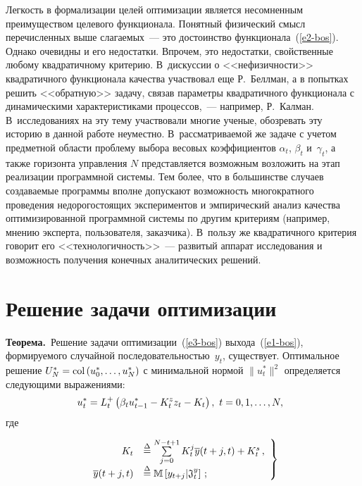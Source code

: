 \begin{multicols}{2}
 Легкость в формализации целей оптимизации является несомненным
преимуществом целевого функционала. Понятный физический смысл
перечисленных выше слагаемых~--- это достоинство
 функционала~(\ref{e2-bos}). Однако очевидны и его недостатки.
Впрочем, это недостатки, свойственные любому квадратичному критерию.
В~дискуссии о <<нефизичности>> квадратичного функционала качества
участвовал еще Р.~Беллман, а в попытках решить <<обратную>> задачу, связав
параметры квад\-ра\-тич\-но\-го функционала с динамическими характеристиками
процессов,~--- например, Р.~Калман. В~исследованиях на эту тему участвовали
многие ученые, обозревать эту историю в данной работе неуместно.
В~рассматриваемой же задаче с учетом предметной области проблему выбора
весовых коэффициентов $\alpha_t$, $\beta_t$ и~$\gamma_t$, а также горизонта
управ\-ле\-ния $N$ представляется возможным возложить на этап реализации
программной системы. Тем более, что в большинстве случаев создаваемые
программы вполне допускают возможность многократного проведения
недорогостоящих экспериментов и эмпирический анализ качества
оптимизированной программной системы по другим критериям (например,
мнению эксперта, пользователя, заказчика). В~пользу же квадратичного
критерия говорит его <<технологичность>>~--- развитый аппарат исследования
и возможность получения конечных аналитических решений.

\section{Решение задачи оптимизации}

 \noindent
 \textbf{Теорема.}\ Решение задачи оптимизации~(\ref{e3-bos})
 выхода~(\ref{e1-bos}), формируемого случайной
последова\-тель\-ностью~$y_t$, существует. Оптимальное решение
$U_N^*\hm= \mathrm{col} \left( u_0^*, \ldots , u_N^*\right)$ с минимальной нормой
$\| u_t^*\|^2$ определяется следующими выражениями:
 \begin{equation}
\hspace*{-3mm}u_t^*=L_t^+ \left( \beta_t u^*_{t-1} -K_t^z z_t -K_t\right),\ t=0,1,\ldots , N,\!\!
 \label{e4-bos}
 \end{equation}
где

\noindent
\begin{equation}
\left.
\begin{array}{rl}
K_t &\stackrel{\Delta}{=} \sum\limits_{j=0}^{N-t+1} K_t^j \overline{y} (t+j,t) +K_t^s\,,\\[6pt]
\overline{y} (t+j,t) &\stackrel{\Delta}{=} \mathbb{M} \left[ y_{t+j}\vert \mathfrak{J}_t^y \right]\,;
\end{array}
\right\}
\label{e5-bos}
\end{equation}


\end{multicols}
